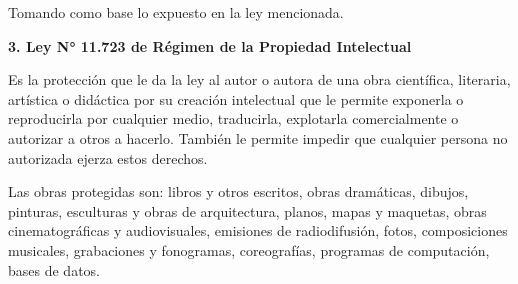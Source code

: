 \documentclass[a4paper,12pt]{article}
\newcommand{\saltolinea}{\par\vspace{\baselineskip}}
\begin{document}
    \par Tomando como base lo expuesto en la ley mencionada. \cite{Ley26388}
    \saltolinea
    \par \textbf{3. Ley N° 11.723 de Régimen de la Propiedad Intelectual} 
    \saltolinea
    \par Es la protección que le da la ley al autor o autora de una obra científica, literaria, artística o didáctica por su creación intelectual que le permite exponerla o reproducirla por cualquier medio, traducirla, explotarla comercialmente o autorizar a otros a hacerlo. También le permite impedir que cualquier persona no autorizada ejerza estos derechos.
    \par Las obras protegidas son: libros y otros escritos, obras dramáticas, dibujos, pinturas, esculturas y obras de arquitectura, planos, mapas y maquetas, obras cinematográficas y audiovisuales, emisiones de radiodifusión, fotos, composiciones musicales, grabaciones y fonogramas, coreografías, programas de computación, bases de datos.\cite{Ley11723}
\end{document}
